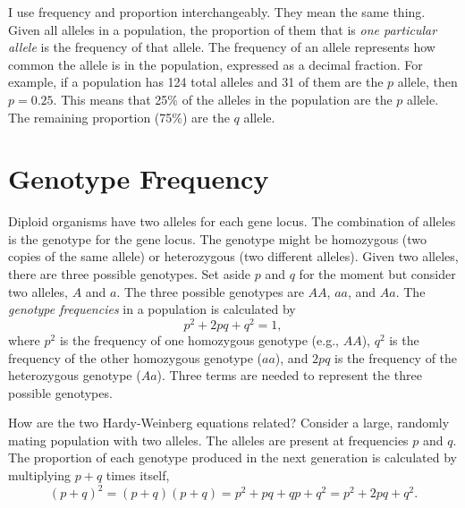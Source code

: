 \documentclass[letterpaper]{tufte-handout}
\begin{document}
I use frequency and proportion interchangeably. They mean the same thing.  Given all alleles in a population, the proportion of them that is \emph{one particular allele} is the frequency of that allele.  The frequency of an allele represents how common the allele is in the population, expressed as a decimal fraction. For example, if a population has 124 total alleles and 31 of them are the $p$ allele, then $p=0.25$.  This means that 25\% of the alleles in the population are the $p$ allele.  The remaining proportion (75\%) are the $q$ allele.

\section{Genotype Frequency}

Diploid organisms have two alleles for each gene locus. The combination of alleles is the genotype for the gene locus. The genotype might be homozygous (two copies of the same allele) or heterozygous (two different alleles).  Given two alleles, there are three possible genotypes. Set aside $p$ and $q$ for the moment but consider two alleles, $A$ and $a$. The three possible genotypes are $AA$, $aa$, and $Aa$.  The \emph{genotype frequencies} in a population is calculated by
\begin{equation*}
p^2 + 2pq+q^2=1,
\end{equation*}
where $p^2$ is the frequency of one homozygous genotype (e.g., $AA$), $q^2$ is the frequency of the other homozygous genotype ($aa$), and $2pq$ is the frequency of the heterozygous genotype ($Aa$).  Three terms are needed to represent the three possible genotypes. 

How are the two Hardy-Weinberg equations related?  Consider a large, randomly mating population with two alleles.  The alleles are present at frequencies $p$ and $q$.  The proportion of each genotype produced in the next generation is calculated by multiplying $p+q$ times itself,
\begin{equation*}
(p+q)^2=
(p+q)(p+q) =
p^2 + pq + qp + q^2 =
p^2 + 2pq + q^2.
\end{equation*}
\end{document}
